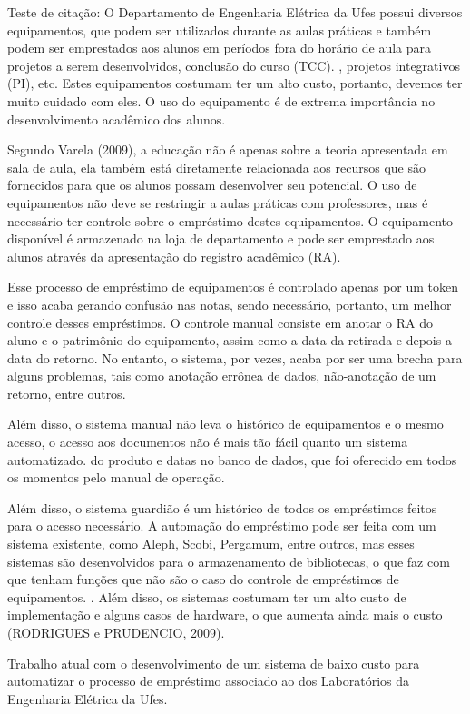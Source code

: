 \vspace{-42pt}
Teste de citação: \cite{DepEngEle}
O Departamento de Engenharia Elétrica da Ufes possui diversos equipamentos, que podem ser utilizados durante as aulas práticas e também podem ser emprestados aos alunos em períodos fora do horário de aula para projetos a serem desenvolvidos, conclusão do curso (TCC). , projetos integrativos (PI), etc. Estes equipamentos costumam ter um alto custo, portanto, devemos ter muito cuidado com eles. O uso do equipamento é de extrema importância no desenvolvimento acadêmico dos alunos.
	
Segundo Varela (2009), a educação não é apenas sobre a teoria apresentada em sala de aula, ela também está diretamente relacionada aos recursos que são fornecidos para que os alunos possam desenvolver seu potencial. O uso de equipamentos não deve se restringir a aulas práticas com professores, mas é necessário ter controle sobre o empréstimo destes equipamentos. O equipamento disponível é armazenado na loja de departamento e pode ser emprestado aos alunos através da apresentação do registro acadêmico (RA).

Esse processo de empréstimo de equipamentos é controlado apenas por um token e isso acaba gerando confusão nas notas, sendo necessário, portanto, um melhor controle desses empréstimos. O controle manual consiste em anotar o RA do aluno e o patrimônio do equipamento, assim como a data da retirada e depois a data do retorno. No entanto, o sistema, por vezes, acaba por ser uma brecha para alguns problemas, tais como anotação errônea de dados, não-anotação de um retorno, entre outros.

Além disso, o sistema manual não leva o histórico de equipamentos e o mesmo acesso, o acesso aos documentos não é mais tão fácil quanto um sistema automatizado. do produto e datas no banco de dados, que foi oferecido em todos os momentos pelo manual de operação.

Além disso, o sistema guardião é um histórico de todos os empréstimos feitos para o acesso necessário. A automação do empréstimo pode ser feita com um sistema existente, como Aleph, Scobi, Pergamum, entre outros, mas esses sistemas são desenvolvidos para o armazenamento de bibliotecas, o que faz com que tenham funções que não são o caso do controle de empréstimos de equipamentos. . Além disso, os sistemas costumam ter um alto custo de implementação e alguns casos de hardware, o que aumenta ainda mais o custo (RODRIGUES e PRUDENCIO, 2009).

Trabalho atual com o desenvolvimento de um sistema de baixo custo para automatizar o processo de empréstimo associado ao dos Laboratórios da Engenharia Elétrica da Ufes.